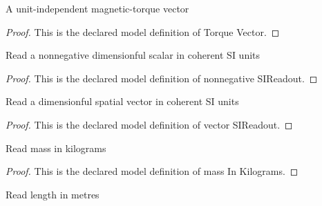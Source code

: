 \begin{definition}
  \label{def:physics:phyx-mini-0967:phyxminiproblems-problemphyxmini0967-torquevector}
  A unit-independent magnetic-torque vector
\end{definition}
\begin{proof}
  This is the declared model definition of Torque Vector.
\end{proof}
\begin{definition}
  \label{def:physics:phyx-mini-0967:phyxminiproblems-problemphyxmini0967-nonnegativesireadout}
  Read a nonnegative dimensionful scalar in coherent SI units
\end{definition}
\begin{proof}
  This is the declared model definition of nonnegative SIReadout.
\end{proof}
\begin{definition}
  \label{def:physics:phyx-mini-0967:phyxminiproblems-problemphyxmini0967-vectorsireadout}
  Read a dimensionful spatial vector in coherent SI units
\end{definition}
\begin{proof}
  This is the declared model definition of vector SIReadout.
\end{proof}
\begin{definition}
  \label{def:physics:phyx-mini-0967:phyxminiproblems-problemphyxmini0967-massinkilograms}
  Read mass in kilograms
\end{definition}
\begin{proof}
  This is the declared model definition of mass In Kilograms.
\end{proof}
\begin{definition}
  \label{def:physics:phyx-mini-0967:phyxminiproblems-problemphyxmini0967-lengthinmeters}
  Read length in metres
\end{definition}
